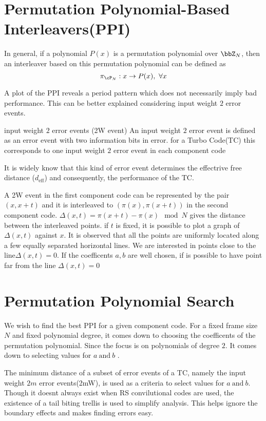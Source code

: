 \documentclass[11pt, oneside, dvipdfmx]{book}
\begin{document}
\section{Permutation Polynomial-Based Interleavers(PPI)}
In general, if a polynomial $P(x)$ is a permutation polynomial over $\bbZ_N$, then an interleaver based on this permutation polynomial can be defined as $$ \pi_{\cP_N} : x \rightarrow P(x), ~ \forall x$$

A plot of the PPI reveals a period pattern which does not necessarily imply bad performance. This can be better explained considering input weight $2$ error events.

\begin{MyDefinition}{input weight $2$ error events (2W event)}
An input weight $2$ error event is defined as an error event with two information bits in error. for a Turbo Code(TC) this corresponds to one input weight $2$ error event in each component code
\end{MyDefinition}

It is widely know  that this kind of error event determines the effectrive free distance ($d_{\text{eff}}$) and consequently, the performance of the TC. 

A 2W event in the first component code can be represented by the pair $(x,x+t)$ and it is interleaved to $(\pi(x),\pi(x+t))$ in the second component code. $\Delta(x,t)=\pi(x+t) - \pi(x) \mod N$ gives the distance between the interleaved points. if $t$ is fixed, it is possible to plot a graph of $\Delta(x,t)$ against $x$. It is observed that all the points are uniformly located along a few equally
separated horizontal lines. We are interested in points close to the line$\Delta(x,t)=0$. If the coefficents $a,b$ are well chosen, if is possible to have point far from the line $\Delta(x,t)=0$

\section{Permutation Polynomial Search} We wish to find the best PPI for a given component code. For a fixed frame size $N$ and fixed polynomial degree, it comes down to choosing the coefficents of the permutation polynomial. Since the focus is on polynomials of degree $2$. It comes down to selecting values for $a ~\text{and}~b$ .

The minimum distance of a subset of error events of a TC, namely the input weight $2m$ error events(2mW), is used as a criteria to select values for $a ~\text{and}~b$. Though it doesnt always exist when RS convilutional codes are used, the existence of a tail biting trellis is used to simplify analysis. This helps ignore the boundary effects and makes finding errors easy.
\end{document}

